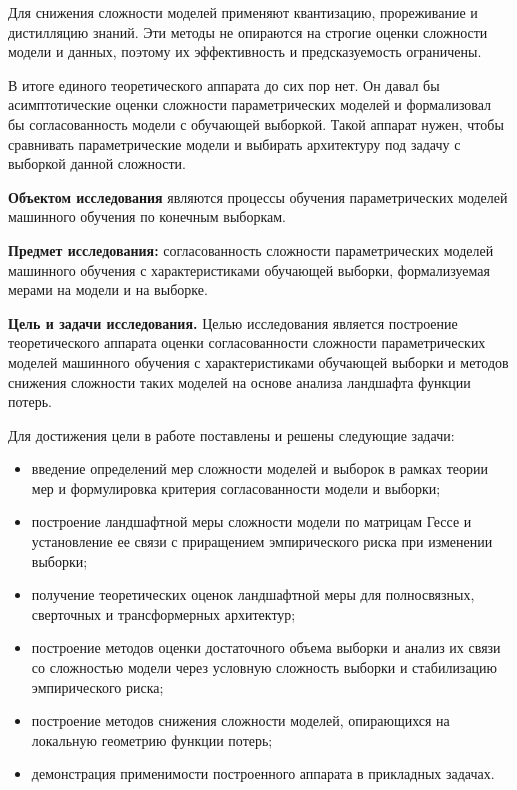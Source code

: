 \documentclass{dissert}
\newcommand{\paragraph}[1]{\noindent\textbf{#1}\quad}
\begin{document}
Для снижения сложности моделей применяют квантизацию, прореживание и дистилляцию знаний.
Эти методы не опираются на строгие оценки сложности модели и данных, поэтому их эффективность и предсказуемость ограничены.

В итоге единого теоретического аппарата до сих пор нет. Он давал бы асимптотические оценки сложности параметрических моделей и формализовал бы согласованность модели с обучающей выборкой.
Такой аппарат нужен, чтобы сравнивать параметрические модели и выбирать архитектуру под задачу с выборкой данной сложности.

\paragraph{Объектом исследования} являются процессы обучения параметрических моделей машинного обучения по конечным выборкам.

\paragraph{Предмет исследования:} согласованность сложности параметрических моделей машинного обучения с характеристиками обучающей выборки, формализуемая мерами на модели и на выборке.

\paragraph{Цель и задачи исследования.}
Целью исследования является построение теоретического аппарата оценки согласованности сложности параметрических моделей машинного обучения с характеристиками обучающей выборки и методов снижения сложности таких моделей на основе анализа ландшафта функции потерь.

Для достижения цели в работе поставлены и решены следующие задачи:
\begin{itemize}
    \item[--] введение определений мер сложности моделей и выборок в рамках теории мер и формулировка критерия согласованности модели и выборки;
    \item[--] построение ландшафтной меры сложности модели по матрицам Гессе и установление ее связи с приращением эмпирического риска при изменении выборки;
    \item[--] получение теоретических оценок ландшафтной меры для полносвязных, сверточных и трансформерных архитектур;
    \item[--] построение методов оценки достаточного объема выборки и анализ их связи со сложностью модели через условную сложность выборки и стабилизацию эмпирического риска;
    \item[--] построение методов снижения сложности моделей, опирающихся на локальную геометрию функции потерь;
    \item[--] демонстрация применимости построенного аппарата в прикладных задачах.
\end{itemize}
\end{document}
